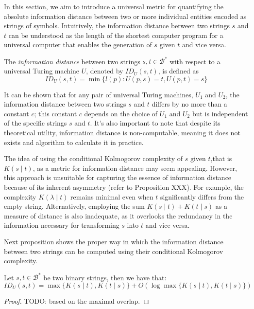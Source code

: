 In this section, we aim to introduce a universal metric for quantifying the absolute information distance between two or more individual entities encoded as strings of symbols. Intuitively, the information distance between two strings $s$ and $t$ can be understood as the length of the shortest computer program for a universal computer that enables the generation of $s$ given $t$ and vice versa.

\begin{definition}
The \emph{information distance} between two strings $s,  t \in \mathcal{B}^{\ast}$ with respect to a universal Turing machine $U$, denoted by $ID_U(s, t)$, is defined as
\[
ID_U(s, t) = \min \{ l(p) : U(p, s) = t, U(p, t) = s \}
\]
\end{definition}

It can be shown that for any pair of universal Turing machines, $U_1$ and $U_2$, the information distance between two strings $s$ and $t$ differs by no more than a constant $c$; this constant $c$ depends on the choice of $U_1$ and $U_2$ but is independent of the specific strings $s$ and $t$. It's also important to note that despite its theoretical utility, information distance is non-computable, meaning it does not exists and algorithm to calculate it in practice.

The idea of using the conditional Kolmogorov complexity of $s$ given $t$,that is $K(s \mid t)$, as a metric for information distance may seem appealing. However, this approach is unsuitable for capturing the essence of information distance because of its inherent asymmetry (refer to Proposition {\color{red} XXX}). For example, the complexity $K(\lambda \mid t)$ remains minimal even when $t$ significantly differs from the empty string. Alternatively, employing the sum $K(s \mid t) + K(t \mid s)$ as a measure of distance is also inadequate, as it overlooks the redundancy in the information necessary for transforming $s$ into $t$ and vice versa.

Next proposition shows the proper way in which the information distance between two strings can be computed using their conditional Kolmogorov complexity.

\begin{proposition}
Let $s,  t \in \mathcal{B}^{\ast}$ be two binary strings, then we have that:
\[
ID_U(s, t) = \max\{ K(s \mid t), K(t \mid s) \} + O ( \log \max\{ K(s \mid t), K(t \mid s) \}) 
\]
\end{proposition}
\begin{proof}
{\color{red} TODO: based on the maximal overlap.}
\end{proof}

